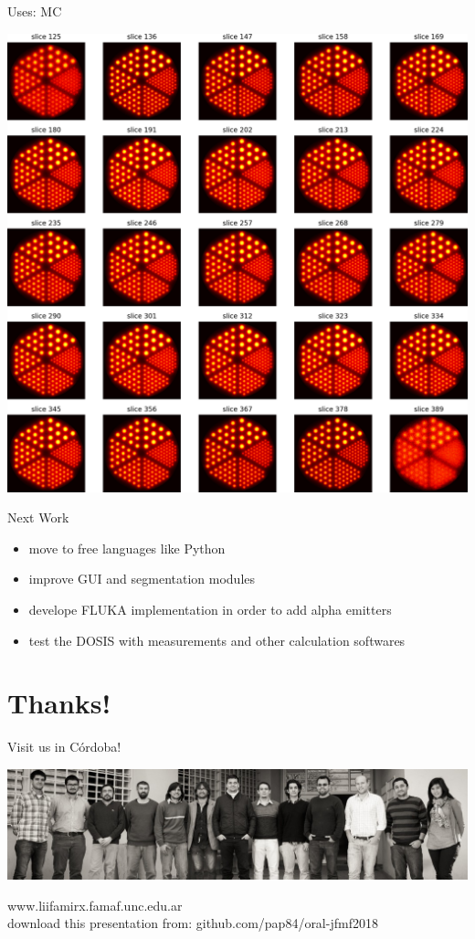 \documentclass[ignorenonframetext,]{beamer}
\begin{document}
\begin{frame}{Uses: MC}
\protect\hypertarget{uses-mc}{}

\begin{center}
\includegraphics[width=.75\textheight]{imgs/now4.png}
\end{center}

\end{frame}

\begin{frame}{Next Work}
\protect\hypertarget{next-work}{}

\begin{itemize}
\item
  move to free languages like Python
\item
  improve GUI and segmentation modules
\item
  develope FLUKA implementation in order to add alpha emitters
\item
  test the DOSIS with measurements and other calculation softwares
\end{itemize}

\end{frame}

\hypertarget{thanks}{%
\section{Thanks!}\label{thanks}}

\begin{frame}{Visit us in Córdoba!}
\protect\hypertarget{visit-us-in-cordoba}{}

\includegraphics{imgs/liifamir.jpg}

\begin{center}
www.liifamirx.famaf.unc.edu.ar\\
\vspace{.4cm}
\footnotesize download this presentation from: github.com/pap84/oral-jfmf2018
\end{center}

\end{frame}
\end{document}

